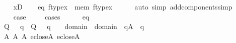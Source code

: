 \begin{isabellebody}
\ \ \isamarkupfalse%
\ {\isacartoucheopen}x{\isasymin}{\isacharquery}{\kern0pt}D{\isacartoucheclose}\isanewline
\ \ \isamarkupfalse%
\ {\isacharparenleft}{\kern0pt}eq{\isacharparenright}{\kern0pt}\ {\isachardoublequoteopen}ftype{\isacharparenleft}{\kern0pt}x{\isacharparenright}{\kern0pt}{\isacharequal}{\kern0pt}{}{\isachardoublequoteclose}\ {\isacharbar}{\kern0pt}\ {\isacharparenleft}{\kern0pt}mem{\isacharparenright}{\kern0pt}\ {\isachardoublequoteopen}ftype{\isacharparenleft}{\kern0pt}x{\isacharparenright}{\kern0pt}{\isacharequal}{\kern0pt}{}{\isachardoublequoteclose}\isanewline
\ \ \ \ \isamarkupfalse%
\ {\isacharparenleft}{\kern0pt}auto\ simp\ add{\isacharcolon}{\kern0pt}components{\isacharunderscore}{\kern0pt}simp{\isacharparenright}{\kern0pt}\isanewline
\ \ \isamarkupfalse%
\ \isanewline
\ \ \isamarkupfalse%
\ {\isacharquery}{\kern0pt}case\ \isanewline
\ \ \isamarkupfalse%
\ cases\isanewline
\ \ \ \ \isamarkupfalse%
\ eq\isanewline
\ \ \ \ \isamarkupfalse%
\ \isanewline
\ \ \ \ \isamarkupfalse%
\ {\isachardoublequoteopen}Q{\isacharparenleft}{\kern0pt}{}{\isacharcomma}{\kern0pt}\ {\isasymsigma}{\isacharcomma}{\kern0pt}\ {\isacharquery}{\kern0pt}{\isasymtau}{\isacharcomma}{\kern0pt}\ q{\isacharparenright}{\kern0pt}\ {\isasymand}\ Q{\isacharparenleft}{\kern0pt}{}{\isacharcomma}{\kern0pt}\ {\isasymsigma}{\isacharcomma}{\kern0pt}\ {\isacharquery}{\kern0pt}{\isasymtheta}{\isacharcomma}{\kern0pt}\ q{\isacharparenright}{\kern0pt}{\isachardoublequoteclose}\ \ {\isachardoublequoteopen}{\isasymsigma}\ {\isasymin}\ domain{\isacharparenleft}{\kern0pt}{\isacharquery}{\kern0pt}{\isasymtau}{\isacharparenright}{\kern0pt}\ {\isasymunion}\ domain{\isacharparenleft}{\kern0pt}{\isacharquery}{\kern0pt}{\isasymtheta}{\isacharparenright}{\kern0pt}{\isachardoublequoteclose}\ \ {\isachardoublequoteopen}q{\isasymin}A{}{\isachardoublequoteclose}\ \ q\ {\isasymsigma}\isanewline
\ \ \ \ \isamarkupfalse%
\ {\isacharminus}{\kern0pt}\isanewline
\ \ \ \ \ \ \isamarkupfalse%
\ {}\isanewline
\ \ \ \ \ \ \isamarkupfalse%
\ A{\isacharcolon}{\kern0pt}\ {\isachardoublequoteopen}{\isacharquery}{\kern0pt}{\isasymtau}{\isasymin}A{}{\isachardoublequoteclose}\ {\isachardoublequoteopen}{\isacharquery}{\kern0pt}{\isasymtheta}{\isasymin}A{}{\isachardoublequoteclose}\ {\isachardoublequoteopen}{\isacharquery}{\kern0pt}{\isasymtau}{\isasymin}eclose{\isacharparenleft}{\kern0pt}A{}{\isacharparenright}{\kern0pt}{\isachardoublequoteclose}\ {\isachardoublequoteopen}{\isacharquery}{\kern0pt}{\isasymtheta}{\isasymin}eclose{\isacharparenleft}{\kern0pt}A{}{\isacharparenright}{\kern0pt}{\isachardoublequoteclose}\isanewline

\end{isabellebody}
